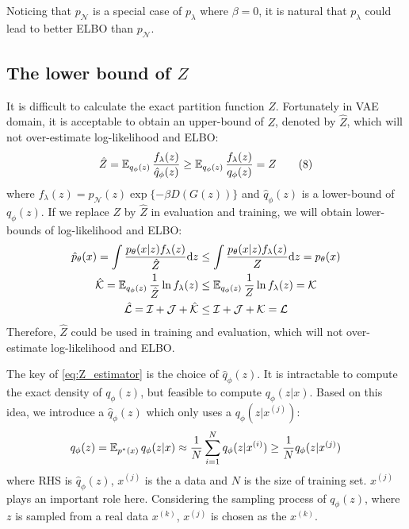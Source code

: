 Noticing that $p_\mathcal{N}$ is a special case of $p_\lambda$ where $\beta = 0$, it is natural that $p_\lambda$ could lead to better ELBO than $p_\mathcal{N}$.

\subsection{The lower bound of $Z$}\label{subsec:determine_z}

It is difficult to calculate the exact partition function $Z$. Fortunately in VAE domain, it is acceptable to obtain an upper-bound of $Z$, denoted by $\hat{Z}$, which will not over-estimate log-likelihood and ELBO:
\begin{align*}\label{eq:Z_estimator}
    \hat{Z} = \operatorname{\mathbb{E}}_{q_\phi(z)} \frac{f_\lambda(z)}{\hat{q}_\phi(z)} \geq
	\operatorname{\mathbb{E}}_{q_\phi(z)}\frac{f_\lambda(z)}{q_\phi(z)} = Z \tag{8}
\end{align*}
where $f_\lambda(z) = p_\mathcal{N}(z) \exp\{- \beta D(G(z))\}$ and $\hat{q}_\phi(z)$ is a lower-bound of $q_\phi(z)$. If we replace $Z$ by $\hat{Z}$ in evaluation and training, we will obtain lower-bounds of log-likelihood and ELBO:
\begin{align*}
	\hat{p}_\theta(x) = \int \frac{p_\theta(x|z) f_\lambda(z)}{\hat{Z}}  \mathrm{d} z &\leq \int \frac{p_\theta(x|z) f_\lambda(z)}{Z} \mathrm{d} z = p_\theta(x)  \\
	\mathcal{\hat{K}} = \operatorname{\mathbb{E}}_{q_\phi(z)} \frac{1}{\hat{Z}}\ln f_\lambda(z) &\leq \operatorname{\mathbb{E}}_{q_\phi(z)} \frac{1}{Z} \ln f_\lambda(z) = \mathcal{K}   \\
    \mathcal{\hat{L}} =  \mathcal{I} + \mathcal{J} + \mathcal{\hat{K}} &\leq \mathcal{I} + \mathcal{J} + \mathcal{K} = \mathcal{L}
\end{align*}
Therefore, $\hat{Z}$ could be used in training and evaluation, which will not over-estimate log-likelihood and ELBO. 

The key of \cref{eq:Z_estimator} is the choice of $\hat{q}_\phi(z)$. It is intractable to compute the exact density of $q_\phi(z)$, but feasible to compute $q_\phi(z|x)$. Based on this idea, we introduce a $\hat{q}_\phi(z)$ which only uses a $q_\phi(z|x^{(j)})$:
\begin{equation*}
	q_\phi(z) = \operatorname{\mathbb{E}}_{p^*(x)} q_\phi(z|x) \approx \frac{1}{N}\sum_{i=1}^N q_\phi(z|x^{(i)}) \geq \frac{1}{N} q_\phi(z|x^{(j)})
\end{equation*}
where RHS is $\hat{q}_\phi(z)$, $x^{(j)}$ is the a data and $N$ is the size of training set. $x^{(j)}$ plays an important role here. Considering the sampling process of $q_\phi(z)$, where $z$ is sampled from a real data $x^{(k)}$, $x^{(j)}$ is chosen as the $x^{(k)}$. 

